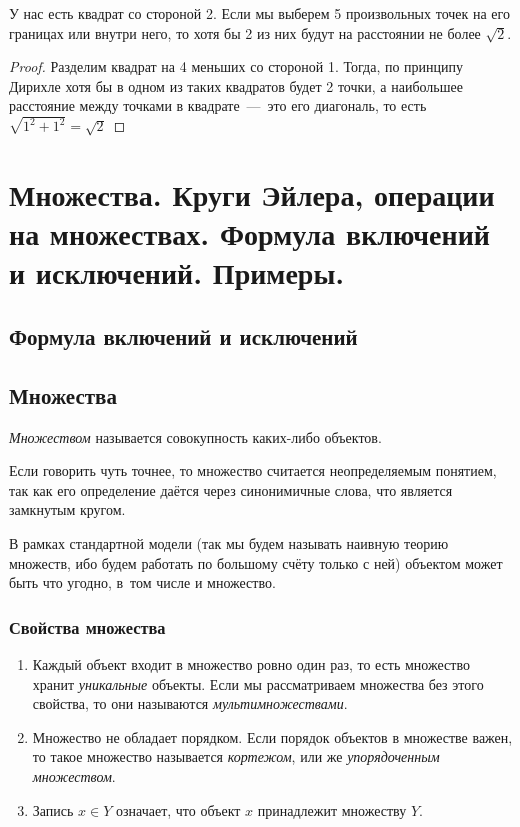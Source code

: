\begin{multicols}{2}
      \Ex У нас есть квадрат со стороной 2. Если мы выберем 5 произвольных точек на его границах или внутри него, то хотя бы 2 из них будут на расстоянии не более $\sqrt{2}$.

      \begin{proof}
        Разделим квадрат на 4 меньших со стороной 1. Тогда, по принципу Дирихле хотя бы в одном из таких квадратов будет 2 точки, а наибольшее расстояние между точками в квадрате~---~это его диагональ, то есть $\sqrt{1^2 + 1^2} = \sqrt{2}$
      \end{proof}

    \section{Множества. Круги Эйлера, операции на множествах. Формула включений и
    исключений. Примеры.}
    \subsection*{Формула включений и исключений}

    \subsection*{Множества}
 
    \begin{definition}{}{}
        \textit{Множеством} называется совокупность каких-либо объектов.
    \end{definition}
     
    \begin{note}{}{}
        Если говорить чуть точнее, то множество считается неопределяемым понятием, так как его определение даётся через синонимичные слова, что является замкнутым кругом.
    \end{note}
     
    \begin{note}{}{}
        В рамках стандартной модели (так мы будем называть наивную теорию множеств, ибо будем работать по большому счёту только с ней) объектом может быть что угодно, в~том числе и множество.
    \end{note}
     
    \subsubsection*{Свойства множества}
     
    \begin{enumerate}
         \item Каждый объект входит в множество ровно один раз, то есть множество хранит \textit{уникальные} объекты. Если мы рассматриваем множества без этого свойства, то они называются \textit{мультимножествами}.
         \item Множество не обладает порядком. Если порядок объектов в множестве важен, то такое множество называется \textit{кортежом}, или же \textit{упорядоченным множеством}.
         \item Запись $x \in Y$ означает, что объект $x$ принадлежит множеству $Y$.
    \end{enumerate}
    

\end{multicols}
